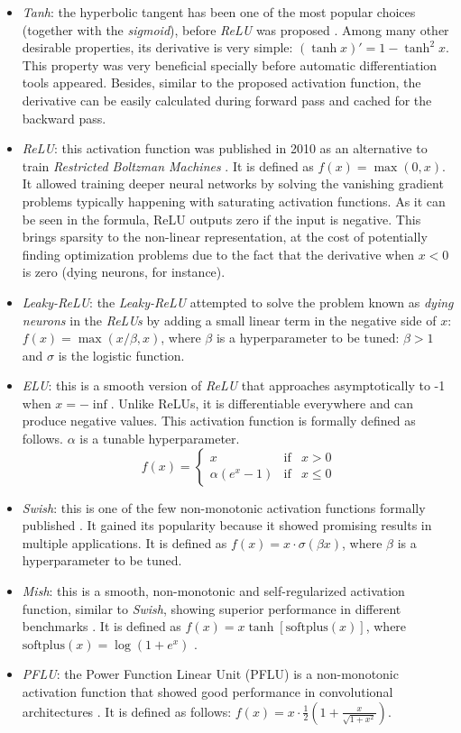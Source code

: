\begin{itemize}
	\item \textit{Tanh}: the hyperbolic tangent has been one of the most popular choices (together with the \textit{sigmoid}), before \textit{ReLU} was proposed \autocite{lecun2012}. Among many other desirable properties, its derivative is very simple: $(\tanh x)'=1-\tanh^2 x$. This property was very beneficial specially before automatic differentiation tools appeared. Besides, similar to the proposed activation function, the derivative can be easily calculated during forward pass and cached for the backward pass.
	\item \textit{ReLU}: this activation function was published in 2010 as an alternative to train \textit{Restricted Boltzman Machines} \autocite{nair2010}. It is defined as $f(x) = \max(0,x)$. It allowed training deeper neural networks by solving the vanishing gradient problems typically happening with saturating activation functions. As it can be seen in the formula, ReLU outputs zero if the input is negative. This brings sparsity to the non-linear representation, at the cost of potentially finding optimization problems due to the fact that the derivative when $x<0$ is zero (dying neurons, for instance).
	\item \textit{Leaky-ReLU}: the \textit{Leaky-ReLU} \autocite{xu2015} attempted to solve the problem known as \textit{dying neurons} in the \textit{ReLUs} by adding a small linear term in the negative side of $x$: $f(x) = \max(x/\beta, x)$, where $\beta$ is a hyperparameter to be tuned: $\beta>1$ and $\sigma$ is the logistic function.
	\item \textit{ELU}: this is a smooth version of \textit{ReLU} \autocite{djork2016} that approaches asymptotically to -1 when $x=-\inf$. Unlike ReLUs, it is differentiable everywhere and can produce negative values. This activation function is formally defined as follows. $\alpha$ is a tunable hyperparameter.
	$$
	f(x)= \left\{ \begin{array}{lcc}
		x &   \text{if}  & x > 0 \\
 \alpha(e^x - 1) &  \text{if} & x \leq 0
	\end{array}
	\right.
	$$

	\item \textit{Swish}: this is one of the few non-monotonic activation functions formally published \autocite{ramachandran2018}. It gained its popularity because it showed promising results in multiple applications. It is defined as $f(x) = x \cdot \sigma(\beta x)$, where $\beta$ is a hyperparameter to be tuned.
	\item \textit{Mish}: this is a smooth, non-monotonic and self-regularized activation function, similar to \textit{Swish}, showing superior performance in different benchmarks \autocite{misra2019mish}. It is defined as $f(x) = x \tanh \left[\text{softplus} (x)\right]$, where $\text{softplus} (x) = \log(1+e^x)$ \autocite{dugas2001}.
	\item \textit{PFLU}: the Power Function Linear Unit (PFLU) is a non-monotonic activation function that showed good performance in convolutional architectures \autocite{zhu2020}. It is defined as follows: $f(x) = x \cdot \frac{1}{2} \left( 1 + \frac{x}{\sqrt{1+x^2}} \right)$.


\end{itemize}
